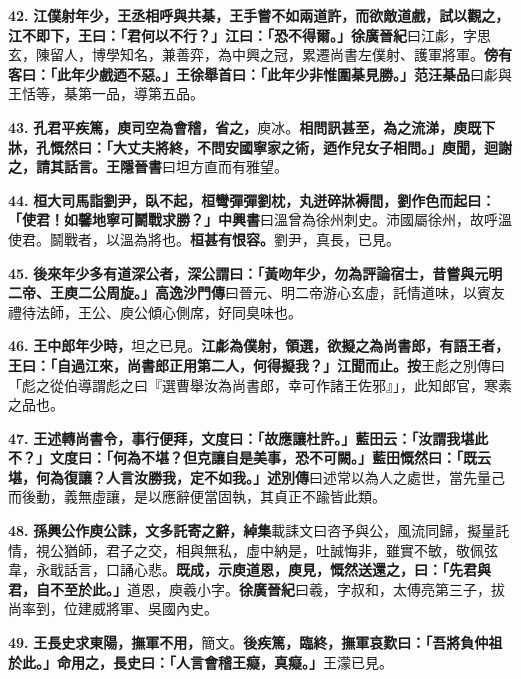 \textbf{42.} \textbf{江僕射年少，王丞相呼與共棊，王手嘗不如兩道許，而欲敵道戲，試以觀之，江不即下，王曰：「君何以不行？」江曰：「恐不得爾。」}{\footnotesize \textbf{徐廣晉紀}曰江虨，字思玄，陳留人，博學知名，兼善弈，為中興之冠，累遷尚書左僕射、護軍將軍。}\textbf{傍有客曰：「此年少戲迺不惡。」王徐舉首曰：「此年少非惟圍棊見勝。」}{\footnotesize \textbf{范汪棊品}曰虨與王恬等，棊第一品，導第五品。}

\textbf{43.} \textbf{孔君平疾篤，庾司空為會稽，省之，}{\footnotesize 庾冰。}\textbf{相問訊甚至，為之流涕，庾既下牀，孔慨然曰：「大丈夫將終，不問安國寧家之術，迺作兒女子相問。」庾聞，迴謝之，請其話言。}{\footnotesize \textbf{王隱晉書}曰坦方直而有雅望。}

\textbf{44.} \textbf{桓大司馬詣劉尹，臥不起，桓彎彈彈劉枕，丸迸碎牀褥間，劉作色而起曰：「使君！如馨地寧可鬬戰求勝？」}{\footnotesize \textbf{中興書}曰溫曾為徐州刺史。沛國屬徐州，故呼溫使君。鬬戰者，以溫為將也。}\textbf{桓甚有恨容。}{\footnotesize 劉尹，真長，已見。}

\textbf{45.} \textbf{後來年少多有道深公者，深公謂曰：「黃吻年少，勿為評論宿士，昔嘗與元明二帝、王庾二公周旋。」}{\footnotesize \textbf{高逸沙門傳}曰晉元、明二帝游心玄虛，託情道味，以賓友禮待法師，王公、庾公傾心側席，好同臭味也。}

\textbf{46.} \textbf{王中郎年少時，}{\footnotesize 坦之已見。}\textbf{江虨為僕射，領選，欲擬之為尚書郎，有語王者，王曰：「自過江來，尚書郎正用第二人，何得擬我？」江聞而止。}{\footnotesize \textbf{按}王彪之別傳曰「彪之從伯導謂彪之曰『選曹舉汝為尚書郎，幸可作諸王佐邪』」，此知郎官，寒素之品也。}

\textbf{47.} \textbf{王述轉尚書令，事行便拜，文度曰：「故應讓杜許。」藍田云：「汝謂我堪此不？」文度曰：「何為不堪？但克讓自是美事，恐不可闕。」藍田慨然曰：「既云堪，何為復讓？人言汝勝我，定不如我。」}{\footnotesize \textbf{述別傳}曰述常以為人之處世，當先量己而後動，義無虛讓，是以應辭便當固執，其貞正不踰皆此類。}

\textbf{48.} \textbf{孫興公作庾公誄，文多託寄之辭，}{\footnotesize \textbf{綽集}載誄文曰咨予與公，風流同歸，擬量託情，視公猶師，君子之交，相與無私，虛中納是，吐誠悔非，雖實不敏，敬佩弦韋，永戢話言，口誦心悲。}\textbf{既成，示庾道恩，庾見，慨然送還之，曰：「先君與君，自不至於此。」}{\footnotesize 道恩，庾羲小字。\textbf{徐廣晉紀}曰羲，字叔和，太傅亮第三子，拔尚率到，位建威將軍、吳國內史。}

\textbf{49.} \textbf{王長史求東陽，撫軍不用，}{\footnotesize 簡文。}\textbf{後疾篤，臨終，撫軍哀歎曰：「吾將負仲祖於此。」命用之，長史曰：「人言會稽王癡，真癡。」}{\footnotesize 王濛已見。}

